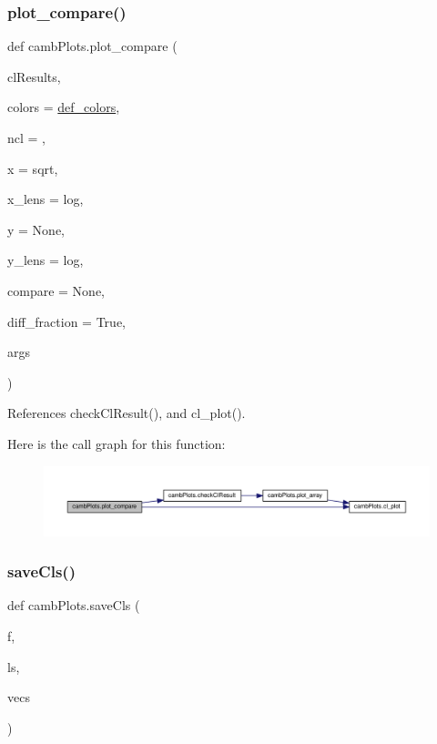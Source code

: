 \subsubsection{\texorpdfstring{plot\+\_\+compare()}{plot\_compare()}}
{\footnotesize\ttfamily def camb\+Plots.\+plot\+\_\+compare (\begin{DoxyParamCaption}\item[{}]{cl\+Results,  }\item[{}]{colors = {\ttfamily \mbox{\hyperlink{namespacecambPlots_ac3e5045bfeb5c7c0e5dfc22c4eae07a8}{def\+\_\+colors}}},  }\item[{}]{ncl = {},  }\item[{}]{x = {\ttfamily \textquotesingle{}sqrt\textquotesingle{}},  }\item[{}]{x\+\_\+lens = {\ttfamily \textquotesingle{}log\textquotesingle{}},  }\item[{}]{y = {\ttfamily None},  }\item[{}]{y\+\_\+lens = {\ttfamily \textquotesingle{}log\textquotesingle{}},  }\item[{}]{compare = {\ttfamily None},  }\item[{}]{diff\+\_\+fraction = {\ttfamily True},  }\item[{}]{args }\end{DoxyParamCaption})}



References check\+Cl\+Result(), and cl\+\_\+plot().

Here is the call graph for this function\+:
\nopagebreak
\begin{figure}[H]
\begin{center}
\leavevmode
\includegraphics[width=350pt]{namespacecambPlots_a5ba7df009754321b923630f25d8f7ddc_cgraph}
\end{center}
\end{figure}
\mbox{\label{namespacecambPlots_ab98294b0b14bbdbda8be11a187411746}} 
\subsubsection{\texorpdfstring{save\+Cls()}{saveCls()}}
{\footnotesize\ttfamily def camb\+Plots.\+save\+Cls (\begin{DoxyParamCaption}\item[{}]{f,  }\item[{}]{ls,  }\item[{}]{vecs }\end{DoxyParamCaption})}



